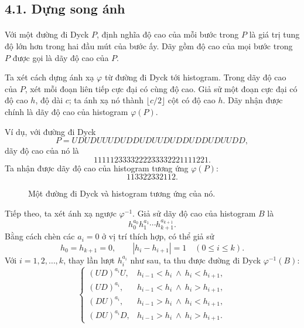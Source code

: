 \documentclass[11pt]{article}
\begin{document}
\subsection*{4.1. Dựng song ánh}

\paragraph{}
Với một đường đi Dyck \(P\), định nghĩa độ cao của mỗi bước trong \(P\) là
giá trị tung độ lớn hơn trong hai đầu mút của bước ấy. Dãy gồm độ cao của mọi
bước trong \(P\) được gọi là dãy độ cao của \(P\).

Ta xét cách dựng ánh xạ \(\varphi\) từ đường đi Dyck tới histogram. Trong dãy
độ cao của \(P\), xét mỗi đoạn liên tiếp cực đại có cùng độ cao. Giả sử một
đoạn cực đại có độ cao \(h\), độ dài \(c\); ta ánh xạ nó thành
\(\lfloor c/2\rfloor\) cột có độ cao \(h\). Dãy nhận được chính là dãy độ cao
của histogram \(\varphi(P)\).

Ví dụ, với đường đi Dyck
\[
  P=UDUDUUUDUDDUDUUDUDDUDDUDUUDD,
\]
dãy độ cao của nó là
\[
  1111123333222233332221111221.
\]
Ta nhận được dãy độ cao của histogram tương ứng \(\varphi(P)\):
\[
  113322332112.
\]

\begin{figure}[ht]
\centering
{}
\caption{Một đường đi Dyck và histogram tương ứng của nó.}
\end{figure}

Tiếp theo, ta xét ánh xạ ngược \(\varphi^{-1}\). Giả sử dãy độ cao của
histogram \(B\) là
\[
  h_0^{a_0}h_1^{a_1}\cdots h_{k+1}^{a_{k+1}}.
\]
Bằng cách chèn các \(a_i=0\) ở vị trí thích hợp, có thể giả sử
\[
  h_0=h_{k+1}=0,\qquad |h_i-h_{i+1}|=1\quad(0\le i\le k).
\]
Với \(i=1,2,\ldots,k\), thay lần lượt \(h_i^{a_i}\) như sau, ta thu được
đường đi Dyck \(\varphi^{-1}(B)\):
\[
\begin{cases}
  (UD)^{a_i}U, & h_{i-1}<h_i\ \wedge\ h_i<h_{i+1},\\
  (UD)^{a_i}, & h_{i-1}<h_i\ \wedge\ h_i>h_{i+1},\\
  (DU)^{a_i}, & h_{i-1}>h_i\ \wedge\ h_i<h_{i+1},\\
  (DU)^{a_i}D, & h_{i-1}>h_i\ \wedge\ h_i>h_{i+1}.
\end{cases}
\]
\end{document}
